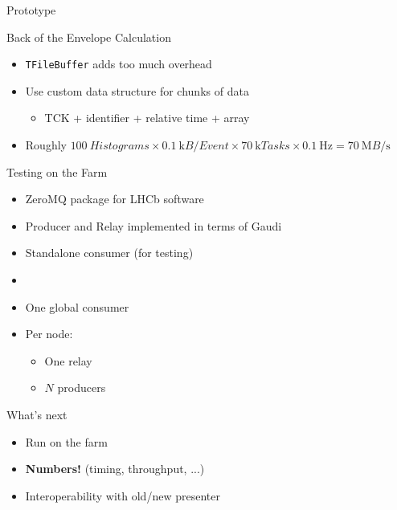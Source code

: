 \documentclass[aspectratio=1610,compress,titleprogressbar]{beamer}
\begin{document}
\begin{frame}{Prototype}
  \begin{block}{Back of the Envelope Calculation}
    \begin{itemize}
      \item \texttt{TFileBuffer} adds too much overhead
      \item Use custom data structure for chunks of data \begin{itemize}
        \item TCK + identifier + relative time + array
      \end{itemize}
      \item Roughly $\SI{100}{Histograms} \times \SI{0.1}{\kilo B\per Event} \times \SI{70}{\kilo Tasks} \times \SI{0.1}{\hertz} = \SI{70}{\mega B\per\second}$
    \end{itemize}
  \end{block}
\end{frame}

\begin{frame}{Testing on the Farm}
  \begin{itemize}
    \item ZeroMQ package for LHCb software
    \item Producer and Relay implemented in terms of Gaudi
    \item Standalone consumer (for testing)
    \item [] {}
    \item One global consumer
    \item Per node: \begin{itemize}
      \item One relay
      \item $N$ producers
    \end{itemize}
  \end{itemize}
\end{frame}

\begin{frame}{What's next}
  \begin{itemize}
    \item Run on the farm
    \item \textbf{Numbers!} (timing, throughput, ...)
    \item Interoperability with old/new presenter
  \end{itemize}
\end{frame}
\end{document}
